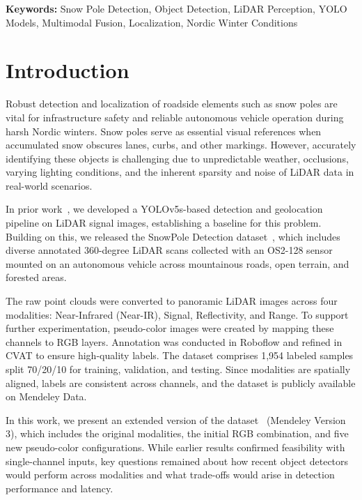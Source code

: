 \documentclass[runningheads]{llncs}
\begin{document}
\textbf{Keywords:} Snow Pole Detection, Object Detection, LiDAR Perception, YOLO Models, Multimodal Fusion, Localization, Nordic Winter Conditions




\section{Introduction}

Robust detection and localization of roadside elements such as snow poles are vital for infrastructure safety and reliable autonomous vehicle operation during harsh Nordic winters. Snow poles serve as essential visual references when accumulated snow obscures lanes, curbs, and other markings. However, accurately identifying these objects is challenging due to unpredictable weather, occlusions, varying lighting conditions, and the inherent sparsity and noise of LiDAR data in real-world scenarios.

In prior work~\cite{bavirisetti2024pole}, we developed a YOLOv5s-based detection and geolocation pipeline on LiDAR signal images, establishing a baseline for this problem. Building on this, we released the SnowPole Detection dataset~\cite{bavirisetti2025snowpole}, which includes diverse annotated 360-degree LiDAR scans collected with an OS2-128 sensor mounted on an autonomous vehicle across mountainous roads, open terrain, and forested areas.

The raw point clouds were converted to panoramic LiDAR images across four modalities: Near-Infrared (Near-IR), Signal, Reflectivity, and Range. To support further experimentation, pseudo-color images were created by mapping these channels to RGB layers. Annotation was conducted in Roboflow and refined in CVAT to ensure high-quality labels. The dataset comprises 1,954 labeled samples split 70/20/10 for training, validation, and testing. Since modalities are spatially aligned, labels are consistent across channels, and the dataset is publicly available on Mendeley Data.

In this work, we present an extended version of the dataset~\cite{bavirisetti2025extended} (Mendeley Version 3), which includes the original modalities, the initial RGB combination, and five new pseudo-color configurations. While earlier results confirmed feasibility with single-channel inputs, key questions remained about how recent object detectors would perform across modalities and what trade-offs would arise in detection performance and latency.
\end{document}
